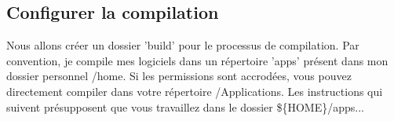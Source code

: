 % 
% 
% 
% 
% 
% 
% 

\subsection{Configurer la compilation}
Nous allons créer un dossier 'build' pour le processus de compilation. Par convention, je compile mes logiciels dans un répertoire 'apps' présent dans mon dossier personnel /home. Si les permissions sont accrodées, vous pouvez directement compiler dans votre répertoire /Applications. Les instructions qui suivent présupposent que vous travaillez dans le dossier \$\{HOME\}/apps...

